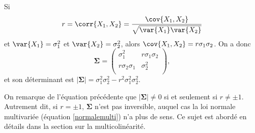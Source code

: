 Si 
$$
r= \corr{X_1,X_2} = \frac{\cov{X_1,X_2}}{\sqrt{\var{X_1} \var{X_2}}}
$$ 
et $\var{X_1}=\sigma_1^2$ et $\var{X_2}=\sigma_2^2$, alors $\cov{X_1,X_2}= r\sigma_1\sigma_2$. On a donc
$$ 
\boldsymbol{\Sigma}=
\begin{pmatrix}
\sigma_1^2 & r\sigma_1\sigma_2 \\
r\sigma_2\sigma_1 & \sigma_2^2 \\
\end{pmatrix},
$$
et son déterminant est $\left|\boldsymbol{\Sigma}\right|=\sigma_1^2 \sigma_2^2 - r^2\sigma_1^2\sigma_2^2.$

\bigskip
On remarque de l'équation précédente que $\left|\boldsymbol{\Sigma}\right| \ne 0$ si et seulement si $r \ne \pm 1$. Autrement dit, si $r= \pm 1$, $\boldsymbol{\Sigma}$ n'est pas inversible, auquel cas la loi normale multivariée (équation \ref{normalemulti}) n'a plus de sens. Ce sujet est abordé en détails dans la section sur la multicolinéarité.

